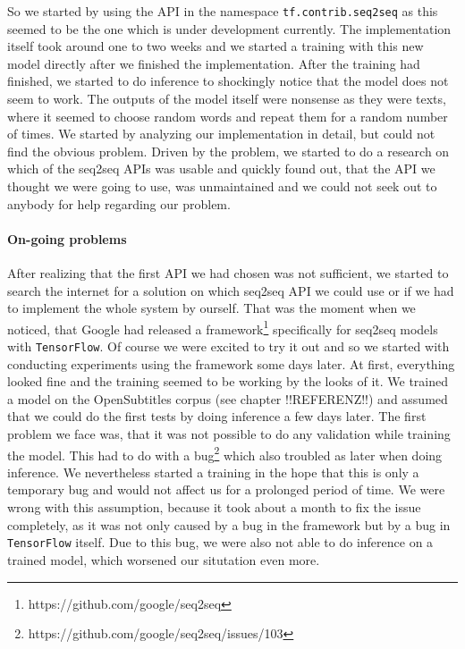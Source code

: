 So we started by using the API in the namespace \texttt{tf.contrib.seq2seq} as this seemed to be the one which is under development currently. The implementation itself took around one to two weeks and we started a training with this new model directly after we finished the implementation. After the training had finished, we started to do inference to shockingly notice that the model does not seem to work. The outputs of the model itself were nonsense as they were texts, where it seemed to choose random words and repeat them for a random number of times. We started by analyzing our implementation in detail, but could not find the obvious problem. Driven by the problem, we started to do a research on which of the seq2seq APIs was usable and quickly found out, that the API we thought we were going to use, was unmaintained and we could not seek out to anybody for help regarding our problem.

\paragraph{On-going problems} After realizing that the first API we had chosen was not sufficient, we started to search the internet for a solution on which seq2seq API we could use or if we had to implement the whole system by ourself. That was the moment when we noticed, that Google had released a framework\footnote{https://github.com/google/seq2seq} specifically for seq2seq models with \texttt{TensorFlow}. Of course we were excited to try it out and so we started with conducting experiments using the framework some days later. At first, everything looked fine and the training seemed to be working by the looks of it. We trained a model on the OpenSubtitles corpus (see chapter !!REFERENZ!!) and assumed that we could do the first tests by doing inference a few days later. The first problem we face was, that it was not possible to do any validation while training the model. This had to do with a bug\footnote{https://github.com/google/seq2seq/issues/103} which also troubled as later when doing inference. We nevertheless started a training in the hope that this is only a temporary bug and would not affect us for a prolonged period of time. We were wrong with this assumption, because it took about a month to fix the issue completely, as it was not only caused by a bug in the framework but by a bug in \texttt{TensorFlow} itself. Due to this bug, we were also not able to do inference on a trained model, which worsened our situtation even more.

